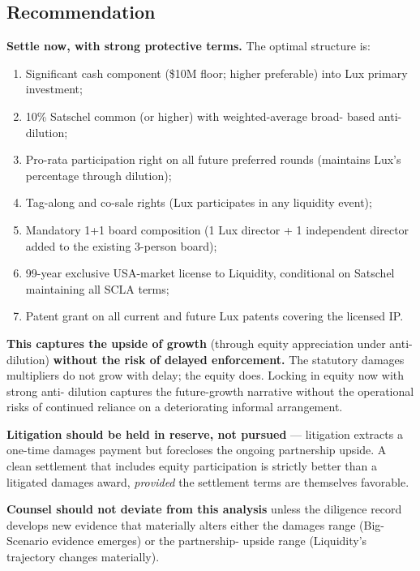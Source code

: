 \documentclass[11pt,letterpaper]{article}
\begin{document}
\subsection*{Recommendation}

\textbf{Settle now, with strong protective terms.} The optimal
structure is:

\begin{enumerate}[leftmargin=1.5em,itemsep=0.2em]
\item Significant cash component (\$10M floor; higher preferable)
into Lux primary investment;
\item 10\% Satschel common (or higher) with weighted-average broad-
based anti-dilution;
\item Pro-rata participation right on all future preferred rounds
(maintains Lux's percentage through dilution);
\item Tag-along and co-sale rights (Lux participates in any
liquidity event);
\item Mandatory 1+1 board composition (1 Lux director + 1
independent director added to the existing 3-person board);
\item 99-year exclusive USA-market license to Liquidity, conditional
on Satschel maintaining all SCLA terms;
\item Patent grant on all current and future Lux patents covering
the licensed IP.
\end{enumerate}

\textbf{This captures the upside of growth} (through equity
appreciation under anti-dilution) \textbf{without the risk of
delayed enforcement.} The statutory damages multipliers do not grow
with delay; the equity does. Locking in equity now with strong anti-
dilution captures the future-growth narrative without the operational
risks of continued reliance on a deteriorating informal arrangement.

\textbf{Litigation should be held in reserve, not pursued} ---
litigation extracts a one-time damages payment but forecloses the
ongoing partnership upside. A clean settlement that includes equity
participation is strictly better than a litigated damages award,
\emph{provided} the settlement terms are themselves favorable.

\textbf{Counsel should not deviate from this analysis} unless the
diligence record develops new evidence that materially alters either
the damages range (Big-Scenario evidence emerges) or the partnership-
upside range (Liquidity's trajectory changes materially).
\end{document}

